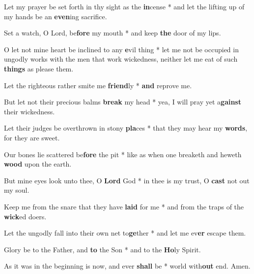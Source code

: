 \begin{multicols}{2}
	Let my prayer be set forth in thy sight as the \textbf{in}cense * and let the lifting up of my hands be an \textbf{even}ing sacrifice.
	
	Set a watch, O Lord, be\textbf{fore} my mouth * and keep \textbf{the} door of my lips.
	
	O let not mine heart be inclined to any \textbf{e}vil thing * let me not be occupied in ungodly works with the men that work wickedness, neither let me eat of such \textbf{things} as please them.
	
	Let the righteous rather smite me \textbf{friend}ly * \textbf{and} reprove me.
	
	But let not their precious balms \textbf{break} my head * yea, I will pray yet a\textbf{gainst} their wickedness.
	
	Let their judges be overthrown in stony \textbf{pla}ces * that they may hear my \textbf{words}, for they are sweet.
	
	Our bones lie scattered be\textbf{fore} the pit * like as when one breaketh and heweth \textbf{wood} upon the earth.
	
	But mine eyes look unto thee, O \textbf{Lord} God * in thee is my trust, O \textbf{cast} not out my soul.
	
	Keep me from the snare that they have \textbf{laid} for me * and from the traps of the \textbf{wick}ed doers.
	
	Let the ungodly fall into their own net to\textbf{ge}ther * and let me ev\textbf{er} escape them.
	
	Glory be to the Father, and \textbf{to} the Son * and to the \textbf{Ho}ly Spirit.
	
	As it was in the beginning is now, and ever \textbf{shall} be * world with\textbf{out} end. Amen.
\end{multicols}